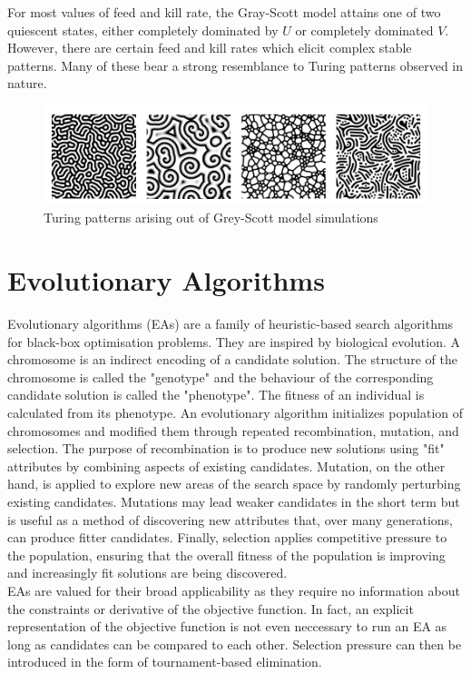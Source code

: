 For most values of feed and kill rate, the Gray-Scott model attains one of two quiescent states, either completely dominated by $U$ or completely dominated $V$. However, there are certain feed and kill rates which elicit complex stable patterns. Many of these bear a strong resemblance to Turing patterns observed in nature.

\begin{figure}[!h]
\centering
\includegraphics[width=\textwidth]{images/turing-patterns.png}
\caption{Turing patterns arising out of Grey-Scott model simulations\cite{sims}}
\label{fig:gs-turing-patterns}
\end{figure}

\section{Evolutionary Algorithms}

Evolutionary algorithms (EAs) are a family of heuristic-based search algorithms for black-box optimisation problems. They are inspired by biological evolution. A chromosome is an indirect encoding of a candidate solution. The structure of the chromosome is called the "genotype" and the behaviour of the corresponding candidate solution is called the "phenotype". The fitness of an individual is calculated from its phenotype. An evolutionary algorithm initializes population of chromosomes and modified them through repeated recombination, mutation, and selection. The purpose of recombination is to produce new solutions using "fit" attributes by combining aspects of existing candidates. Mutation, on the other hand, is applied to explore new areas of the search space by randomly perturbing existing candidates. Mutations may lead weaker candidates in the short term but is useful as a method of discovering new attributes that, over many generations, can produce fitter candidates. Finally, selection applies competitive pressure to the population, ensuring that the overall fitness of the population is improving and increasingly fit solutions are being discovered.\\

EAs are valued for their broad applicability as they require no information about the constraints or derivative of the objective function. In fact, an explicit representation of the objective function is not even neccessary to run an EA as long as candidates can be compared to each other. Selection pressure can then be introduced in the form of tournament-based elimination.\\

